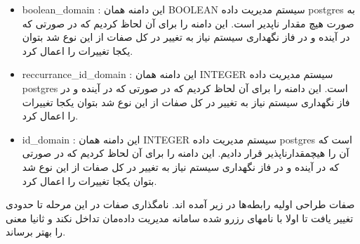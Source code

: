 \documentclass{article}
\begin{document}
\begin{itemize}
	\item
	boolean\_domain
	: این دامنه همان BOOLEAN سیستم مدیریت داده postgres به صورت هیچ مقدار ناپدیر است. این دامنه را برای آن لحاظ کردیم که در صورتی که در آینده و در فاز نگهداری سیستم نیاز به تغییر در کل صفات از این نوع شد بتوان یکجا تغییرات را اعمال کرد. 
	\item
	reccurrance\_id\_domain
	: این دامنه همان INTEGER سیستم مدیریت داده postgres است. این دامنه را برای آن لحاظ کردیم که در صورتی که در آینده و در فاز نگهداری سیستم نیاز به تغییر در کل صفات از این نوع شد بتوان یکجا تغییرات را اعمال کرد. 
	\item
	id\_domain
	: این دامنه همان INTEGER سیستم مدیریت داده postgres است که آن را هیچمقدارناپذیر قرار دادیم. این دامنه را برای آن لحاظ کردیم که در صورتی که در آینده و در فاز نگهداری سیستم نیاز به تغییر در کل صفات از این نوع شد بتوان یکجا تغییرات را اعمال کرد. 
\end{itemize}
صفات طراحی اولیه رابطه‌ها در زیر آمده اند. نامگذاری صفات در این مرحله تا حدودی تغییر یافت تا اولا با نامهای رزرو شده سامانه مدیریت داده‌مان تداخل نکند و ثانیا معنی را بهتر برساند. 
\latin
\end{document}
